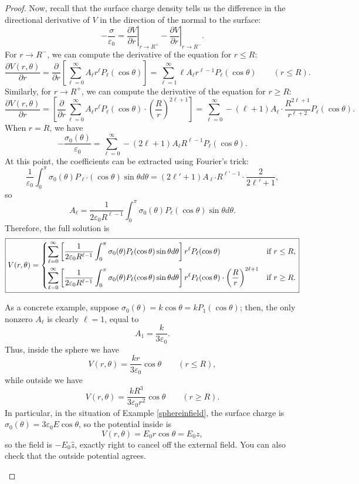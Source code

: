 \begin{proof}
Now, recall that the surface charge density tells us the difference in the directional derivative of $V$ in the direction of the normal to the surface:
\[-\frac{\sigma}{\varepsilon_0}=\left.\frac{\partial V}{\partial r}\right\rvert_{r\to R^+}-\left.\frac{\partial V}{\partial r}\right\rvert_{r\to R^-}.\]
For $r\to R^-$, we can compute the derivative of the equation for $r\le R$:
\[\frac{\partial V(r,\theta)}{\partial r}=\frac{\partial}{\partial r}\left[\sum_{\ell=0}^\infty A_\ell r^\ell P_\ell(\cos\theta)\right]=\sum_{\ell=1}^\infty \ell A_\ell r^{\ell-1}P_\ell(\cos\theta)\qquad (r\le R).\]
Similarly, for $r\to R^+$, we can compute the derivative of the equation for $r\ge R$:
\[\frac{\partial V(r,\theta)}{\partial r}=\left[\frac{\partial}{\partial r}\sum_{\ell=0}^\infty A_{\ell} r^\ell P_\ell(\cos\theta)\cdot\left(\frac{R}{r}\right)^{2\ell+1}\right]=\sum_{\ell=0}^\infty -(\ell+1)A_\ell \cdot \frac{R^{2\ell+1}}{r^{\ell+2}}P_\ell(\cos\theta).\]
When $r=R$, we have
\[-\frac{\sigma_0(\theta)}{\varepsilon_0}=\sum_{\ell=0}^\infty -(2\ell+1)A_\ell R^{\ell-1}P_\ell(\cos\theta).\]
At this point, the coefficients can be extracted using Fourier's trick:
\[\frac{1}{\varepsilon_0}\int_0^\pi \sigma_0(\theta)P_{\ell'}(\cos\theta)\sin\theta d\theta=(2\ell'+1)A_{\ell'}R^{\ell'-1}\cdot \frac{2}{2\ell'+1},\]
so
\[A_{\ell}=\frac{1}{2\varepsilon_0 R^{\ell-1}}\int_0^\pi \sigma_0(\theta)P_\ell(\cos\theta)\sin\theta d\theta.\]
Therefore, the full solution is
\[\boxed{V(r,\theta)=\begin{dcases}
\sum_{\ell=0}^\infty \left[\frac{1}{2\varepsilon_0 R^{\ell-1}}\int_0^\pi \sigma_0(\theta)P_\ell(\cos\theta)\sin\theta d\theta\right]r^\ell P_\ell(\cos\theta) & \text{if }r\le R,\\
\sum_{\ell=0}^\infty \left[\frac{1}{2\varepsilon_0 R^{\ell-1}}\int_0^\pi \sigma_0(\theta)P_\ell(\cos\theta)\sin\theta d\theta\right]r^\ell P_\ell(\cos\theta)\cdot\left(\frac{R}{r}\right)^{2\ell+1} & \text{if }r\ge R.
\end{dcases}}\]

\begin{remark}
As a concrete example, suppose $\sigma_0(\theta)=k\cos\theta=kP_1(\cos\theta)$; then, the only nonzero $A_\ell$ is clearly $\ell=1$, equal to
\[A_1=\frac{k}{3\varepsilon_0}.\]
Thus, inside the sphere we have
\[V(r,\theta)=\frac{kr}{3\varepsilon_0}\cos\theta \qquad (r\le R),\]
while outside we have
\[V(r,\theta)=\frac{kR^3}{3\varepsilon_0r^2}\cos\theta\qquad (r\ge R).\]
In particular, in the situation of Example \ref{sphereinfield}, the surface charge is $\sigma_0(\theta)=3\varepsilon_0 E\cos\theta$, so the potential inside is
\[V(r,\theta)=E_0r\cos\theta=E_0z,\]
so the field is $-E_0\hat{z}$, exactly right to cancel off the external field. You can also check that the outside potential agrees.
\end{remark}

\end{proof}